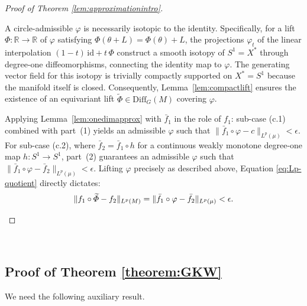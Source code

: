 \documentclass[12pt,a4paper]{amsart}
\theoremstyle{plain}
\theoremstyle{definition}
\theoremstyle{remark}
\begin{document}
\begin{proof}[Proof of Theorem \ref{lem:approximationintro}]
\begin{enumerate}[label=\textup{(\alph*)}, font=\upshape]
  A circle-admissible $\varphi$ is necessarily isotopic to the identity. Specifically, for a lift $\Phi \colon \mathbb{R} \to \mathbb{R}$ of $\varphi$ satisfying $\Phi(\theta+L) = \Phi(\theta)+L$, the projections $\varphi_t$ of the linear interpolation $(1-t)\,\mathrm{id} + t\,\Phi$ construct a smooth isotopy of $S^1 = X^*$ through degree-one diffeomorphisms, connecting the identity map to $\varphi$. The generating vector field for this isotopy is trivially compactly supported on $X^* = S^1$ because the manifold itself is closed. Consequently, Lemma~\ref{lem:compactlift} ensures the existence of an equivariant lift $\widetilde{\Phi} \in \mathrm{Diff}_G(M)$ covering $\varphi$.

  Applying Lemma~\ref{lem:onedimapprox} with $\bar{f}_1$ in the role of $f_1$: sub-case \textup{(c.1)} combined with part~(1) yields an admissible $\varphi$ such that $\|\bar{f}_1 \circ \varphi - c\|_{L^p(\mu)} < \epsilon$. For sub-case \textup{(c.2)}, where $\bar{f}_2 = \bar{f}_1 \circ h$ for a continuous weakly monotone degree-one map $h \colon S^1 \to S^1$, part~(2) guarantees an admissible $\varphi$ such that $\|\bar{f}_1 \circ \varphi - \bar{f}_2\|_{L^p(\mu)} < \epsilon$. Lifting $\varphi$ precisely as described above, Equation \eqref{eq:Lp-quotient} directly dictates:
  \[
    \|f_1 \circ \widetilde{\Phi} - f_2\|_{L^p(M)} = \|\bar{f}_1 \circ \varphi - \bar{f}_2\|_{L^p(\mu)} < \epsilon. \qedhere
  \]
\end{enumerate}
\end{proof}

\ 

\subsection{Proof of Theorem \ref{theorem:GKW}}

We need the following auxiliary result.
\end{document}
